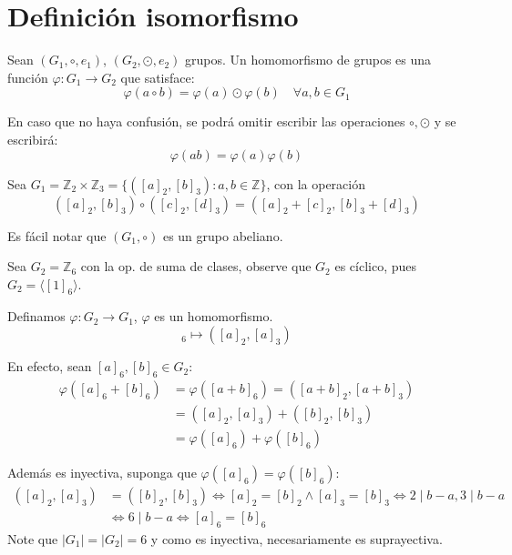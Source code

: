 \section{Definición isomorfismo}%
\label{sec:Definición isomorfismo}

\begin{defi}
	Sean $(G_1, \circ, e_1)$, $(G_2, \odot, e_2)$ grupos. Un homomorfismo de grupos es una función $\varphi: G_1 \to G_2$ que satisface:
	\begin{equation*}
		\varphi(a \circ b) = \varphi(a) \odot \varphi(b) \quad \forall a, b \in G_1
	\end{equation*}
\end{defi}

En caso que no haya confusión, se podrá omitir escribir las operaciones $\circ, \odot$ y se escribirá:
\begin{equation*}
	\varphi(ab) = \varphi(a)\varphi(b)
\end{equation*}

\begin{eje}
	Sea $G_1 = \mathbb{Z}_2 \times \mathbb{Z}_3 = \{ ([a]_2, [b]_3) : a, b \in \mathbb{Z} \}$, con la operación
	\begin{equation*}
		([a]_2, [b]_3) \circ ([c]_2, [d]_3) = ([a]_2 + [c]_2, [b]_3 + [d]_3)
	\end{equation*}
\end{eje}

Es fácil notar que $(G_1, \circ)$ es un grupo abeliano.

Sea $G_2 = \mathbb{Z}_6$ con la op. de suma de clases, observe que $G_2$ es cíclico, pues $G_2 = \langle [1]_6 \rangle$.

Definamos $\varphi: G_2 \to G_1$, $\varphi$ es un homomorfismo.
\begin{equation*}
	[a]_6 \mapsto ([a]_2, [a]_3)
\end{equation*}

En efecto, sean $[a]_6, [b]_6 \in G_2$:
\begin{align*}
	\varphi([a]_6 + [b]_6) & = \varphi([a+b]_6) = ([a+b]_2, [a+b]_3) \\
	                       & = ([a]_2, [a]_3) + ([b]_2, [b]_3)       \\
	                       & = \varphi([a]_6) + \varphi([b]_6)
\end{align*}

Además es inyectiva, suponga que $\varphi([a]_6) = \varphi([b]_6)$:
\begin{align*}
	([a]_2, [a]_3) &= ([b]_2, [b]_3) \iff [a]_2 = [b]_2 \land [a]_3 = [b]_3 \iff 2 \mid b-a, 3 \mid b-a \\
				   &\iff 6 \mid b-a \iff [a]_6 = [b]_6
\end{align*}
Note que $|G_1| = |G_2| = 6$ y como es inyectiva, necesariamente es suprayectiva.

